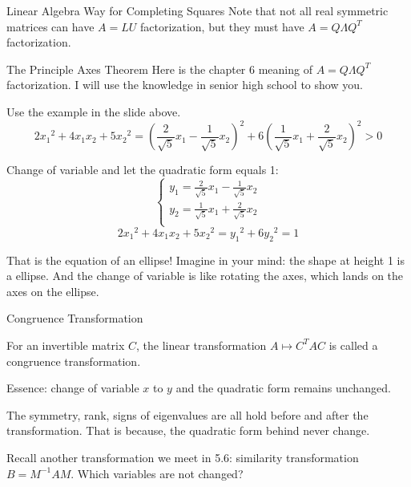 \documentclass{beamer}
\begin{document}
\begin{frame}{Linear Algebra Way for Completing Squares}
Note that not all real symmetric matrices can have $A=LU$ factorization, but they must have $A=Q\varLambda Q^T$ factorization.

\end{frame}

\begin{frame}{The Principle Axes Theorem}
Here is the chapter 6 meaning of $A=Q\varLambda Q^T$ factorization. I will use the knowledge in senior high school to show you.

\vspace{3pt}
Use the example in the slide above.
\begin{equation*}
    2{x_1}^2+4x_1x_2+5{x_2}^2=\left( \frac{2}{\sqrt{5}}x_1-\frac{1}{\sqrt{5}}x_2 \right) ^2+6\left( \frac{1}{\sqrt{5}}x_1+\frac{2}{\sqrt{5}}x_2 \right) ^2>0
\end{equation*}

Change of variable and let the quadratic form equals 1:
\begin{equation*}
    \begin{cases}
        y_1=\frac{2}{\sqrt{5}}x_1-\frac{1}{\sqrt{5}}x_2\\
        y_2=\frac{1}{\sqrt{5}}x_1+\frac{2}{\sqrt{5}}x_2\\
    \end{cases}
\end{equation*}
\begin{equation*}
    2{x_1}^2+4x_1x_2+5{x_2}^2={y_1}^2+6{y_2}^2=1
\end{equation*}

That is the equation of an ellipse! Imagine in your mind: the shape at height 1 is a ellipse. And the change of variable is like rotating the axes, which lands on the axes on the ellipse.
\end{frame}

\begin{frame}{Congruence Transformation}
\begin{definition}
    For an invertible matrix $C$, the linear transformation $A\mapsto C^TAC$ is called a congruence transformation.
\end{definition}

Essence: change of variable $x$ to $y$ and the quadratic form remains unchanged.

\vspace{3pt}
The symmetry, rank, signs of eigenvalues are all hold before and after the transformation. That is because, the quadratic form behind never change.

\vspace{3pt}
Recall another transformation we meet in 5.6: similarity transformation $B=M^{-1}AM$. Which variables are not changed?
\end{frame}
\end{document}
